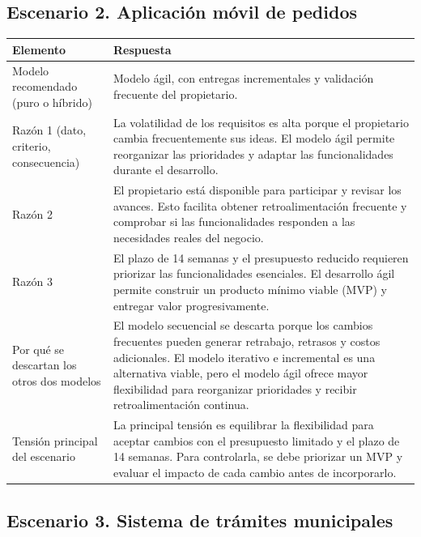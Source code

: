 \documentclass[11pt,a4paper]{article}
\begin{document}
	\subsection{Escenario 2. Aplicación móvil de pedidos}
	
	\begin{tabularx}{\textwidth}{|p{4.5cm}|Y|}
		\hline
		\textbf{Elemento} & \textbf{Respuesta} \\ \hline
		
		Modelo recomendado (puro o híbrido) &
		Modelo ágil, con entregas incrementales y validación frecuente del propietario. \\ \hline
		
		Razón 1 (dato, criterio, consecuencia) &
		La volatilidad de los requisitos es alta porque el propietario cambia frecuentemente sus ideas. El modelo ágil permite reorganizar las prioridades y adaptar las funcionalidades durante el desarrollo. \\ \hline
		
		Razón 2 &
		El propietario está disponible para participar y revisar los avances. Esto facilita obtener retroalimentación frecuente y comprobar si las funcionalidades responden a las necesidades reales del negocio. \\ \hline
		
		Razón 3 &
		El plazo de 14 semanas y el presupuesto reducido requieren priorizar las funcionalidades esenciales. El desarrollo ágil permite construir un producto mínimo viable (MVP) y entregar valor progresivamente. \\ \hline
		
		Por qué se descartan los otros dos modelos &
		El modelo secuencial se descarta porque los cambios frecuentes pueden generar retrabajo, retrasos y costos adicionales. El modelo iterativo e incremental es una alternativa viable, pero el modelo ágil ofrece mayor flexibilidad para reorganizar prioridades y recibir retroalimentación continua. \\ \hline
		
		Tensión principal del escenario &
		La principal tensión es equilibrar la flexibilidad para aceptar cambios con el presupuesto limitado y el plazo de 14 semanas. Para controlarla, se debe priorizar un MVP y evaluar el impacto de cada cambio antes de incorporarlo. \\ \hline
	\end{tabularx}
	
	\subsection{Escenario 3. Sistema de trámites municipales}
	
\end{document}
